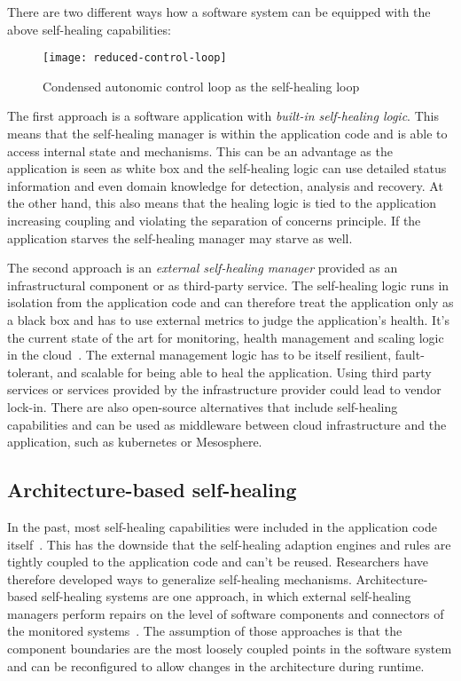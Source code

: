   There are two different ways how a software system can be equipped with the above self-healing capabilities:

  \begin{figure}
    \centering
    \texttt{[image: reduced-control-loop]}
    \caption{Condensed autonomic control loop as the self-healing loop}
    \label{fig:self-healing-loop}
  \end{figure}

  The first approach is a software application with \textit{built-in self-healing logic}.
  This means that the self-healing manager is within the application code and is able to access internal state and mechanisms.
  This can be an advantage as the application is seen as white box and the self-healing logic can use detailed status information and even domain knowledge for detection, analysis and recovery.
  At the other hand, this also means that the healing logic is tied to the application increasing coupling and violating the separation of concerns principle.
  If the application starves the self-healing manager may starve as well.

  The second approach is an \textit{external self-healing manager} provided as an infrastructural component or as third-party service.
  The self-healing logic runs in isolation from the application code and can therefore treat the application only as a black box and has to use external metrics to judge the application's health.
  It's the current state of the art for monitoring, health management and scaling logic in the cloud~\cite{ToffettiMicroservices}.
  The external management logic has to be itself resilient, fault-tolerant, and scalable for being able to heal the application.
  Using third party services or services provided by the infrastructure provider could lead to vendor lock-in.
  There are also open-source alternatives that include self-healing capabilities and can be used as middleware between cloud infrastructure and the application, such as \gls{kubernetes} or Mesosphere.

\subsection{Architecture-based self-healing}
  In the past, most self-healing capabilities were included in the application code itself~\cite{SchmerlsArchitecture}.
  This has the downside that the self-healing adaption engines and rules are tightly coupled to the application code and can't be reused.
  Researchers have therefore developed ways to generalize self-healing mechanisms.
  Architecture-based self-healing systems are one approach, in which external self-healing managers perform repairs on the level of software components and connectors of the monitored systems~\cite{DashofyArchitecture}.
  The assumption of those approaches is that the component boundaries are the most loosely coupled points in the software system and can be reconfigured to allow changes in the architecture during runtime.

